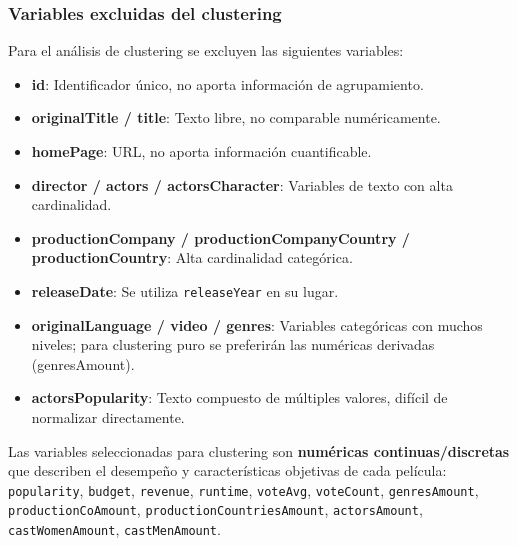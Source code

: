 \documentclass[
]{article}
\providecommand{\tightlist}{%
  \setlength{\itemsep}{0pt}\setlength{\parskip}{0pt}}
\begin{document}
\subsubsection{Variables excluidas del
clustering}\label{variables-excluidas-del-clustering}

Para el análisis de clustering se excluyen las siguientes variables:

\begin{itemize}
\tightlist
\item
  \textbf{id}: Identificador único, no aporta información de
  agrupamiento.
\item
  \textbf{originalTitle / title}: Texto libre, no comparable
  numéricamente.
\item
  \textbf{homePage}: URL, no aporta información cuantificable.
\item
  \textbf{director / actors / actorsCharacter}: Variables de texto con
  alta cardinalidad.
\item
  \textbf{productionCompany / productionCompanyCountry /
  productionCountry}: Alta cardinalidad categórica.
\item
  \textbf{releaseDate}: Se utiliza \texttt{releaseYear} en su lugar.
\item
  \textbf{originalLanguage / video / genres}: Variables categóricas con
  muchos niveles; para clustering puro se preferirán las numéricas
  derivadas (genresAmount).
\item
  \textbf{actorsPopularity}: Texto compuesto de múltiples valores,
  difícil de normalizar directamente.
\end{itemize}

Las variables seleccionadas para clustering son \textbf{numéricas
continuas/discretas} que describen el desempeño y características
objetivas de cada película:\\
\texttt{popularity}, \texttt{budget}, \texttt{revenue},
\texttt{runtime}, \texttt{voteAvg}, \texttt{voteCount},
\texttt{genresAmount}, \texttt{productionCoAmount},
\texttt{productionCountriesAmount}, \texttt{actorsAmount},
\texttt{castWomenAmount}, \texttt{castMenAmount}.
\end{document}
